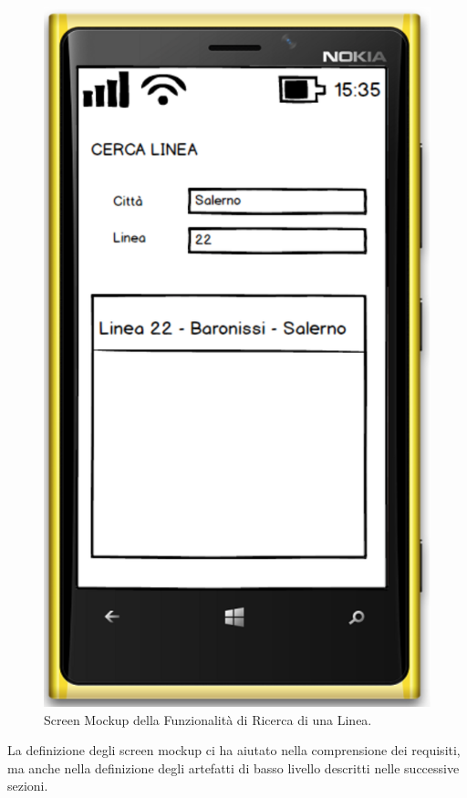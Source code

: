 \begin{figure}[h]
\centering
\includegraphics[scale=.3]{img/ui.png}
\caption{Screen Mockup della Funzionalit\`{a} di Ricerca di una Linea.}
\label{fig:ui}
\end{figure} 

La definizione degli screen mockup ci ha aiutato nella comprensione dei requisiti, ma anche nella definizione degli artefatti di basso livello descritti nelle successive sezioni. 

